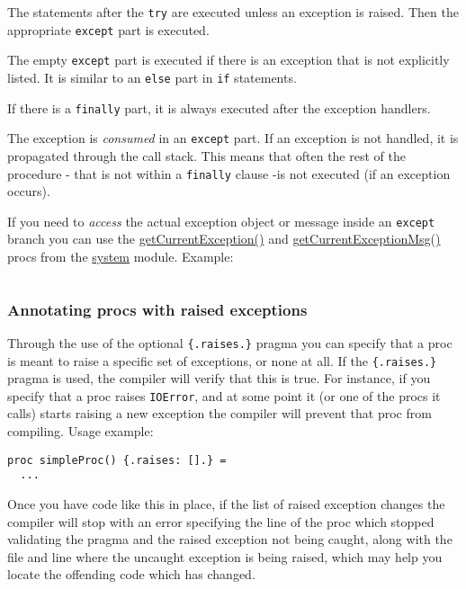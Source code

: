 The statements after the \texttt{try} are executed unless an exception
is raised. Then the appropriate \texttt{except} part is executed.

The empty \texttt{except} part is executed if there is an exception that
is not explicitly listed. It is similar to an \texttt{else} part in
\texttt{if} statements.

If there is a \texttt{finally} part, it is always executed after the
exception handlers.

The exception is \emph{consumed} in an \texttt{except} part. If an
exception is not handled, it is propagated through the call stack. This
means that often the rest of the procedure - that is not within a
\texttt{finally} clause -is not executed (if an exception occurs).

If you need to \emph{access} the actual exception object or message
inside an \texttt{except} branch you can use the
\href{system.html\#getCurrentException}{getCurrentException()} and
\href{system.html\#getCurrentExceptionMsg}{getCurrentExceptionMsg()}
procs from the \href{system.html}{system} module. Example:

\begin{verbatim}
\end{verbatim}

\hypertarget{annotating-procs-with-raised-exceptions}{%
\subsubsection{Annotating procs with raised
exceptions}\label{annotating-procs-with-raised-exceptions}}

Through the use of the optional \texttt{\{.raises.\}} pragma you can
specify that a proc is meant to raise a specific set of exceptions, or
none at all. If the \texttt{\{.raises.\}} pragma is used, the compiler
will verify that this is true. For instance, if you specify that a proc
raises \texttt{IOError}, and at some point it (or one of the procs it
calls) starts raising a new exception the compiler will prevent that
proc from compiling. Usage example:

\begin{verbatim}
proc simpleProc() {.raises: [].} =
  ...
\end{verbatim}

Once you have code like this in place, if the list of raised exception
changes the compiler will stop with an error specifying the line of the
proc which stopped validating the pragma and the raised exception not
being caught, along with the file and line where the uncaught exception
is being raised, which may help you locate the offending code which has
changed.

